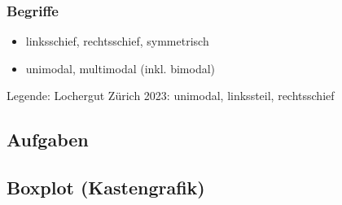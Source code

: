 \subsubsection{Begriffe}
\begin{itemize}
\item linksschief, rechtsschief, symmetrisch
\item unimodal, multimodal (inkl. bimodal)
\end{itemize}

\begin{center}\small{Legende: Lochergut Zürich 2023: unimodal,
    linkssteil, rechtsschief}\end{center}


\newpage

\subsection*{Aufgaben}

  
\newpage

\subsection{Boxplot (Kastengrafik)}




